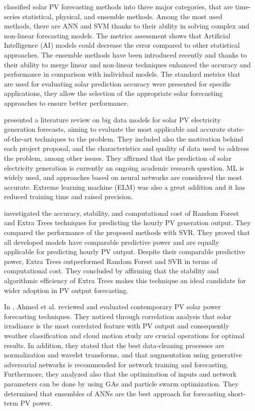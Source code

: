 \cite{SOBRI2018459} classified solar PV forecasting methods into three major categories, that are time-series statistical, physical, and ensemble methods.
Among the most used methods, there are ANN and SVM thanks to their ability in solving complex and non-linear forecasting models.
The metrics assessment shows that Artificial Intelligence (AI) models could decrease the error compared to other statistical approaches.
The ensemble methods have been introduced recently and thanks to their ability to merge linear and non-linear techniques enhanced the accuracy and performance in comparison with individual models.
The standard metrics that are used for evaluating solar prediction accuracy were presented for specific applications, they allow the selection of the appropriate solar forecasting approaches to ensure better performance.

\cite{DEFREITASVISCONDI201954} presented a literature review on big data models for solar PV electricity generation forecasts, aiming to evaluate the most applicable and accurate state-of-the-art techniques to the problem.
They included also the motivation behind each project proposal, and the characteristics and quality of data used to address the problem, among other issues.
They affirmed that the prediction of solar electricity generation is currently an ongoing academic research question.
ML is widely used, and approaches based on neural networks are considered the most accurate.
Extreme learning machine (ELM) was also a great addition and it has reduced training time and raised precision.

\cite{AHMAD2018465} investigated the accuracy, stability, and computational cost of Random Forest and Extra Trees techniques for predicting the hourly PV generation output.
They compared the performance of the proposed methods with SVR.
They proved that all developed models have comparable predictive power and are equally applicable for predicting hourly PV output.
Despite their comparable predictive power, Extra Trees outperformed Random Forest and SVR in terms of computational cost.
They concluded by affirming that the stability and algorithmic efficiency of Extra Trees makes this technique an ideal candidate for wider adoption in PV output forecasting.

In \cite{AHMED2020109792}, Ahmed et al. reviewed and evaluated contemporary PV solar power forecasting techniques.
They noticed through correlation analysis that solar irradiance is the most correlated feature with PV output and consequently weather classification and cloud motion study are crucial operations for optimal results.
In addition, they stated that the best data-cleaning processes are normalization and wavelet transforms, and that augmentation using generative adversarial networks is recommended for network training and forecasting.
Furthermore, they analyzed also that the optimization of inputs and network parameters can be done by using GAs and particle swarm optimization.
They determined that ensembles of ANNs are the best approach for forecasting short-term PV power.

